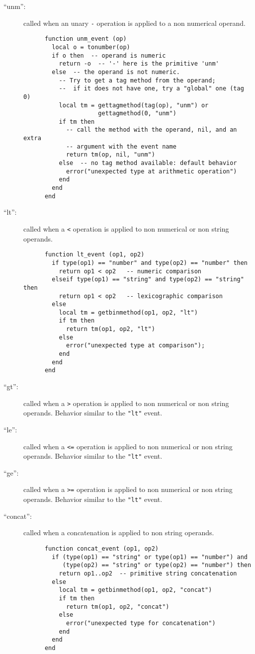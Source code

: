 \documentclass[11pt]{article}
\begin{document}
\begin{description}
\item[``unm'':]
called when an unary \verb|-| operation is applied to a non numerical operand.
\begin{verbatim}
      function unm_event (op)
        local o = tonumber(op)
        if o then  -- operand is numeric
          return -o  -- '-' here is the primitive 'unm'
        else  -- the operand is not numeric.
          -- Try to get a tag method from the operand;
          --  if it does not have one, try a "global" one (tag 0)
          local tm = gettagmethod(tag(op), "unm") or
                     gettagmethod(0, "unm")
          if tm then
            -- call the method with the operand, nil, and an extra
            -- argument with the event name
            return tm(op, nil, "unm")
          else  -- no tag method available: default behavior
            error("unexpected type at arithmetic operation")
          end
        end
      end
\end{verbatim}

\item[``lt'':]
called when a \verb|<| operation is applied to non numerical
or non string operands.
\begin{verbatim}
      function lt_event (op1, op2)
        if type(op1) == "number" and type(op2) == "number" then
          return op1 < op2   -- numeric comparison
        elseif type(op1) == "string" and type(op2) == "string" then
          return op1 < op2   -- lexicographic comparison
        else
          local tm = getbinmethod(op1, op2, "lt")
          if tm then
            return tm(op1, op2, "lt")
          else
            error("unexpected type at comparison");
          end
        end
      end
\end{verbatim}

\item[``gt'':]
called when a \verb|>| operation is applied to non numerical
or non string operands.
Behavior similar to the \verb|"lt"| event.

\item[``le'':]
called when a \verb|<=| operation is applied to non numerical
or non string operands.
Behavior similar to the \verb|"lt"| event.

\item[``ge'':]
called when a \verb|>=| operation is applied to non numerical
or non string operands.
Behavior similar to the \verb|"lt"| event.

\item[``concat'':]
called when a concatenation is applied to non string operands.
\begin{verbatim}
      function concat_event (op1, op2)
        if (type(op1) == "string" or type(op1) == "number") and
           (type(op2) == "string" or type(op2) == "number") then
          return op1..op2  -- primitive string concatenation
        else
          local tm = getbinmethod(op1, op2, "concat")
          if tm then
            return tm(op1, op2, "concat")
          else
            error("unexpected type for concatenation")
          end
        end
      end
\end{verbatim}


\end{description}
\end{document}
